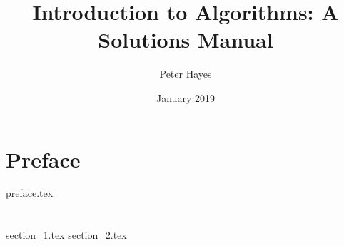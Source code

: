 \documentclass[12pt]{book}
\title{Introduction to Algorithms: A Solutions Manual}
\author{Peter Hayes}
\date{January 2019}
\begin{document}
 
    \begin{titlepage}
        \maketitle
    \end{titlepage}

    \chapter*{Preface}
    {preface.tex} 

    \chapter{}
    {section_1.tex}
    {section_2.tex}
\end{document}
